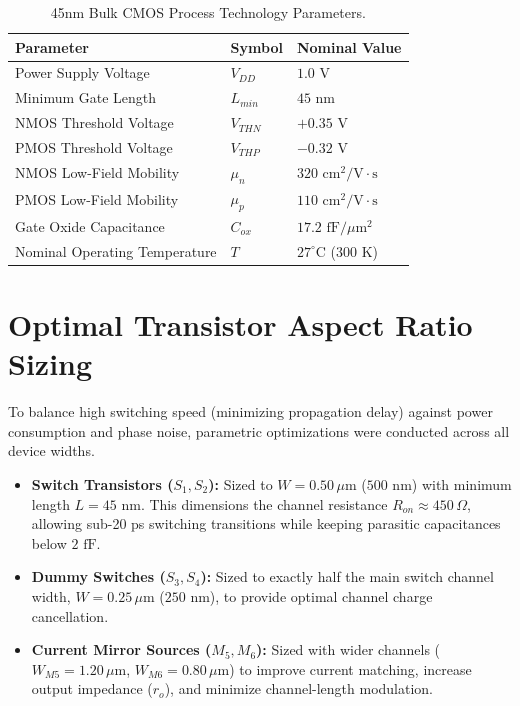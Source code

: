 \documentclass[11pt,a4paper]{report}
\begin{document}
\begin{table}[H]
    \centering
    \caption{45nm Bulk CMOS Process Technology Parameters.}
    \label{tab:tech_params}
    \begin{tabularx}{0.85\textwidth}{Xll}
        \toprule
        \textbf{Parameter} & \textbf{Symbol} & \textbf{Nominal Value} \\
        \midrule
        Power Supply Voltage & $V_{DD}$ & $1.0\text{ V}$ \\
        Minimum Gate Length & $L_{min}$ & $45\text{ nm}$ \\
        NMOS Threshold Voltage & $V_{THN}$ & $+0.35\text{ V}$ \\
        PMOS Threshold Voltage & $V_{THP}$ & $-0.32\text{ V}$ \\
        NMOS Low-Field Mobility & $\mu_n$ & $320\text{ cm}^2/\text{V}\cdot\text{s}$ \\
        PMOS Low-Field Mobility & $\mu_p$ & $110\text{ cm}^2/\text{V}\cdot\text{s}$ \\
        Gate Oxide Capacitance & $C_{ox}$ & $17.2\text{ fF}/\mu\text{m}^2$ \\
        Nominal Operating Temperature & $T$ & $27^\circ\text{C}$ ($300\text{ K}$) \\
        \bottomrule
    \end{tabularx}
\end{table}

\section{Optimal Transistor Aspect Ratio Sizing}
To balance high switching speed (minimizing propagation delay) against power consumption and phase noise, parametric optimizations were conducted across all device widths.
\begin{itemize}
    \item \textbf{Switch Transistors ($S_1, S_2$):} Sized to $W = 0.50\,\mu\text{m}$ ($500\text{ nm}$) with minimum length $L = 45\text{ nm}$. This dimensions the channel resistance $R_{on} \approx 450\,\Omega$, allowing sub-20 ps switching transitions while keeping parasitic capacitances below $2\text{ fF}$.
    \item \textbf{Dummy Switches ($S_3, S_4$):} Sized to exactly half the main switch channel width, $W = 0.25\,\mu\text{m}$ ($250\text{ nm}$), to provide optimal channel charge cancellation.
    \item \textbf{Current Mirror Sources ($M_5, M_6$):} Sized with wider channels ($W_{M5} = 1.20\,\mu\text{m}$, $W_{M6} = 0.80\,\mu\text{m}$) to improve current matching, increase output impedance ($r_o$), and minimize channel-length modulation.
\end{itemize}
\end{document}
